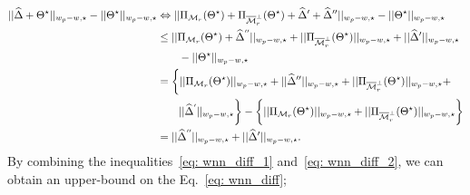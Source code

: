 \documentclass[12pt]{article}
\newcommand*{\myprime}{^{\prime}\mkern-1.2mu}
\newcommand*{\mydprime}{^{\prime\prime}\mkern-1.2mu}
\begin{document}
\begin{align}
||\widehat{\Delta} + \Theta^{\star}||_{w_{p} - w, \star} -  ||\Theta^{\star}||_{w_{p} - w, \star} 
 & \Leftrightarrow  ||\Pi_{\mathcal{M}_{r}}(\Theta^{\star}) + \Pi_{\overline{\mathcal{M}}_{r}^{\perp}}(\Theta^{\star}) + \widehat{\Delta}' + \widehat{\Delta}''||_{w_{p} - w, \star} - ||\Theta^{\star}||_{w_{p} - w, \star} \nonumber\\
 & \leq ||\Pi_{\mathcal{M}_{r}}(\Theta^{\star}) + \widehat{\Delta}^{\mydprime}||_{w_{p} - w, \star} + || \Pi_{\overline{\mathcal{M}}_{r}^{\perp}}(\Theta^{\star}) ||_{w_{p} - w, \star} + ||\widehat{\Delta}'||_{w_{p} - w, \star} 
 \nonumber \\
 & \qquad - ||\Theta^{\star}||_{w_{p} - w, \star} \nonumber\\
 & = \bigg\{ ||\Pi_{\mathcal{M}_{r}}(\Theta^{\star})||_{w_{p} - w, \star} + || \widehat{\Delta}''||_{w_{p} - w, \star}  + || \Pi_{\overline{\mathcal{M}}_{r}^{\perp}}(\Theta^{\star}) ||_{w_{p} - w, \star} + \nonumber\\
 & \qquad ||\widehat{\Delta}^{\myprime} ||_{w_{p} - w, \star} \bigg\}  - \bigg\{ ||\Pi_{\mathcal{M}_{r}}(\Theta^{\star})||_{w_{p} - w, \star} + || \Pi_{\overline{\mathcal{M}}_{r}^{\perp}}(\Theta^{\star}) ||_{w_{p} - w, \star} \bigg\} \nonumber\\
 & = ||\widehat{\Delta}^{\mydprime}||_{w_{p} - w, \star}  + ||\widehat{\Delta}'||_{w_{p} - w, \star}. \label{eq: wnn_diff_2} 
\end{align}
By combining the inequalities~\eqref{eq: wnn_diff_1} and~\eqref{eq: wnn_diff_2}, we can obtain an upper-bound on the Eq.~\eqref{eq: wnn_diff};
\end{document}
